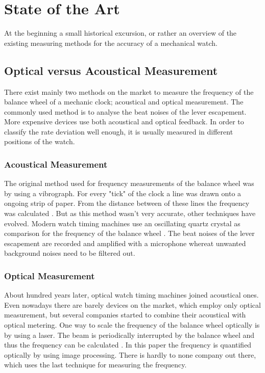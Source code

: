 \documentclass[12pt, a4paper]{report}
\begin{document}
    \section{State of the Art}
    At the beginning a small historical excursion, or rather an overview of the existing measuring methods for the accuracy of a mechanical watch.
     \subsection{Optical versus Acoustical Measurement}
    There exist mainly two methods on the market to measure the frequency of the balance wheel of a mechanic clock; acoustical and optical measurement. The commonly used method is to analyse the beat noises of the lever escapement. More expensive devices use both acoustical and optical feedback. In order to classify the rate deviation well enough, it is usually measured in different positions of the watch.
    
    \subsubsection{Acoustical Measurement}
    The original method used for frequency measurements of the balance wheel was by using a vibrograph. For every "tick" of the clock a line was drawn onto a ongoing strip of paper. From the distance between of these lines the frequency was calculated \cite{Zeitwaage}. But as this method wasn't very accurate, other techniques have evolved.  
    Modern watch timing machines use an oscillating quartz crystal as comparison for the frequency of the balance wheel \cite{Zeitwaage}. The beat noises of the lever escapement are recorded and amplified with a microphone whereat unwanted background noises need to be filtered out. 
    
    \subsubsection{Optical Measurement}
    About hundred years later, optical watch timing machines joined acoustical ones. Even nowadays there are barely devices on the market, which employ only optical measurement, but several companies started to combine their acoustical with optical metering. One way to scale the frequency of the balance wheel optically is by using a laser. The beam is periodically interrupted by the balance wheel and thus the frequency can be calculated \cite{Lombardi2011}. In this paper the frequency is quantified optically by using image processing. There is hardly to none company out there, which uses the last technique for measuring the frequency.
    
\end{document}
